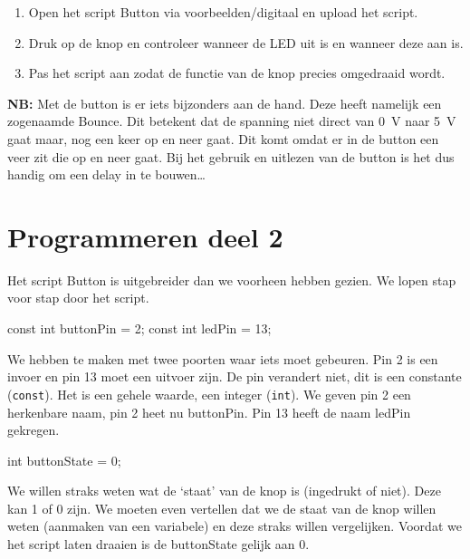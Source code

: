 \documentclass{arduino}
\begin{document}
\begin{enumerate}[label={\alph*})]
\item Open het script Button via voorbeelden/digitaal en upload het script.

\item Druk op de knop en controleer wanneer de LED uit is en wanneer deze aan is.

\item Pas het script aan zodat de functie van de knop precies omgedraaid wordt.
\end{enumerate}


\textbf{NB:} Met de button is er iets bijzonders aan de hand. Deze heeft namelijk een zogenaamde Bounce. Dit betekent dat de spanning niet direct van \SI{0}{\volt} naar \SI{5}{\volt} gaat maar, nog een keer op en neer gaat. Dit komt omdat er in de button een veer zit die op en neer gaat. Bij het gebruik en uitlezen van de button is het dus handig om een delay in te bouwen\dots

\newpage

\section{Programmeren deel 2}

Het script Button is uitgebreider dan we voorheen hebben gezien. We lopen stap voor stap door het script.

\begin{marginlisting}
const int buttonPin = 2;
const int ledPin = 13;
\end{marginlisting}

We hebben te maken met twee poorten waar iets moet gebeuren. Pin 2 is een invoer en pin 13 moet een uitvoer zijn. De pin verandert niet, dit is een constante (\lstinline{const}). Het is een gehele waarde, een integer (\lstinline{int}). We geven pin 2 een herkenbare naam, pin 2 heet nu buttonPin. Pin 13 heeft de naam ledPin gekregen.

\begin{marginlisting}
int buttonState = 0;
\end{marginlisting}

We willen straks weten wat de ‘staat’ van de knop is (ingedrukt of niet). Deze kan 1 of 0 zijn. We moeten even vertellen dat we de staat van de knop willen weten (aanmaken van een variabele) en deze straks willen vergelijken. Voordat we het script laten draaien is de buttonState gelijk aan 0.
\end{document}
